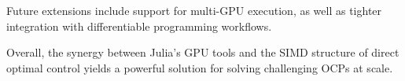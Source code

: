 \documentclass[twoside,leqno,twocolumn]{article}
\begin{document}

Future extensions include support for multi-GPU execution, as well as tighter integration with differentiable programming workflows.

Overall, the synergy between Julia’s GPU tools and the SIMD structure of direct optimal control yields a powerful solution for solving challenging OCPs at scale.


\small
% 


\end{document}
